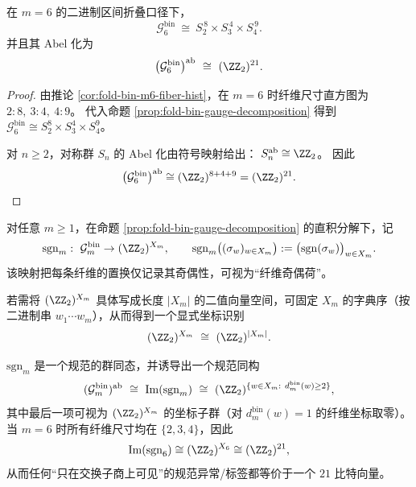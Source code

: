 \begin{corollary}[\texorpdfstring{$m=6$}{m=6} 的 gauge 群与 \texorpdfstring{$(\ZZ_2)^{21}$}{(Z2)^21} 电荷格]\label{cor:fold-bin-gauge-m6}
在 \(m=6\) 的二进制区间折叠口径下，
\[
\mathcal{G}^{\mathrm{bin}}_6
\ \cong\
S_{2}^{\,8}\times S_{3}^{\,4}\times S_{4}^{\,9}.
\]
并且其 Abel 化为
\[
\bigl(\mathcal{G}^{\mathrm{bin}}_6\bigr)^{\mathrm{ab}}
\ \cong\
(\ZZ_2)^{21}.
\]
\end{corollary}
\begin{proof}
由推论 \ref{cor:fold-bin-m6-fiber-hist}，在 \(m=6\) 时纤维尺寸直方图为
\(
2:8,\ 3:4,\ 4:9
\)。
代入命题 \ref{prop:fold-bin-gauge-decomposition} 得到
\(
\mathcal{G}^{\mathrm{bin}}_6\cong S_2^{8}\times S_3^{4}\times S_4^{9}
\)。
\par
对 \(n\ge 2\)，对称群 \(S_n\) 的 Abel 化由符号映射给出：
\(
S_n^{\mathrm{ab}}\cong \ZZ_2
\)。
因此
\[
\bigl(\mathcal{G}^{\mathrm{bin}}_6\bigr)^{\mathrm{ab}}
\cong (\ZZ_2)^{8+4+9}=(\ZZ_2)^{21}.
\]
\end{proof}

\begin{definition}[纤维奇偶荷与符号映射]\label{def:fold-bin-gauge-sign}
对任意 \(m\ge 1\)，在命题 \ref{prop:fold-bin-gauge-decomposition} 的直积分解下，记
\[
\mathrm{sgn}_m:\ \mathcal{G}^{\mathrm{bin}}_m\to (\ZZ_2)^{X_m},
\qquad
\mathrm{sgn}_m\bigl((\sigma_w)_{w\in X_m}\bigr):=\bigl(\mathrm{sgn}(\sigma_w)\bigr)_{w\in X_m}.
\]
该映射把每条纤维的置换仅记录其奇偶性，可视为“纤维奇偶荷”。
\par
若需将 \((\ZZ_2)^{X_m}\) 具体写成长度 \(|X_m|\) 的二值向量空间，可固定 \(X_m\) 的字典序（按二进制串 \(w_1\cdots w_m\)），从而得到一个显式坐标识别
\[
(\ZZ_2)^{X_m}\ \cong\ (\ZZ_2)^{|X_m|}.
\]
\end{definition}

\begin{corollary}[纤维奇偶荷的规范性与 \texorpdfstring{$m=6$}{m=6} 的 \(21\) 比特签名]\label{cor:fold-bin-gauge-sign}
\(\mathrm{sgn}_m\) 是一个规范的群同态，并诱导出一个规范同构
\[
(\mathcal{G}^{\mathrm{bin}}_m)^{\mathrm{ab}}
\ \cong\
\mathrm{Im}(\mathrm{sgn}_m)
\ \cong\
(\ZZ_2)^{\{w\in X_m:\ d^{\mathrm{bin}}_m(w)\ge 2\}},
\]
其中最后一项可视为 \((\ZZ_2)^{X_m}\) 的坐标子群（对 \(d^{\mathrm{bin}}_m(w)=1\) 的纤维坐标取零）。
当 \(m=6\) 时所有纤维尺寸均在 \(\{2,3,4\}\)，因此
\[
\mathrm{Im}(\mathrm{sgn}_6)\cong (\ZZ_2)^{X_6}\cong (\ZZ_2)^{21},
\]
从而任何“只在交换子商上可见”的规范异常/标签都等价于一个 \(21\) 比特向量。
\end{corollary}

